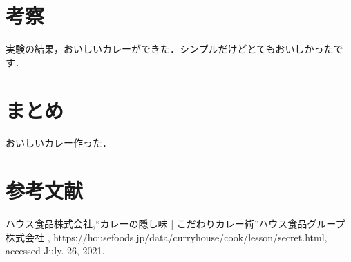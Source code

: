 \documentclass[a4paper, 11pt]{jsarticle}
\begin{document}
\section{考察}

実験の結果，おいしいカレーができた．シンプルだけどとてもおいしかったです．

\section{まとめ}

おいしいカレー作った．

\section{参考文献}
\begin{thebibliography}{9}
	{ハウス食品株式会社},``カレーの隠し味 | こだわりカレー術''ハウス食品グループ株式会社 , https://housefoods.jp/data/curryhouse/cook/lesson/secret.html, accessed July. 26, 2021.
\end{thebibliography}
\end{document}
